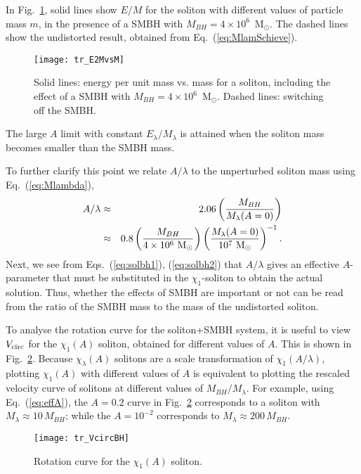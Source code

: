 \documentclass[aps,prd,floats,superscriptaddress,showpacs,nofootinbib,twocolumn,preprintnumbers]{revtex4-1}%
\def\be{\begin{eqnarray}}
\def\ee{\end{eqnarray}}
\def\no{\nonumber}
\begin{document}
\begin{appendix}
In Fig.~\ref{fig:E2MvsM}, solid lines show $E/M$ for the soliton with
different values of particle mass $m$, in the presence of a SMBH with
$M_{BH}=4\times10^6$~M$_\odot$. The dashed lines show the undistorted
result, obtained from Eq.~(\ref{eq:MlamSchieve}).  
%
\begin{figure}[hbp!]
\centering
\texttt{[image: tr\_E2MvsM]}
\caption{
Solid lines: energy per unit mass vs. mass for a soliton, including the effect of a SMBH with $M_{BH}=4\times10^6$~M$_\odot$. Dashed lines: switching off the SMBH.
}\label{fig:E2MvsM}
\end{figure}
%
The large $A$ limit with constant $E_\lambda/M_\lambda$ is attained
when the soliton mass becomes smaller than the SMBH mass. 

To further
clarify this
point we relate $A/\lambda$ to the
unperturbed soliton mass using Eq.~(\ref{eq:Mlambda}),  
%
\be \label{eq:effA}A/\lambda&\approx&2.06\left(\frac{M_{BH}}{M_\lambda(A=0)}
\right)
\\
&\approx&0.8\left(\frac{M_{BH}}{4\times10^6~\rm M_\odot}\right)
\left(\frac{M_\lambda(A=0)}{10^{7}~\rm M_\odot}\right)^{-1}.\no\ee
%
Next, we see from Eqs.~(\ref{eq:solbh1}),
(\ref{eq:solbh2}) that $A/\lambda$ gives an effective $A$-parameter
that must be substituted in the $\chi_1$-soliton to obtain the actual
solution. Thus, whether the effects of SMBH are important or not can be
read from the ratio of the SMBH mass to the mass of the undistorted
soliton. 

To analyse the rotation curve for the soliton+SMBH system, it is useful to view $V_{\rm circ}$ for the $\chi_1(A)$ soliton, obtained for different values of $A$. This is shown in Fig.~\ref{fig:VcircBH}. Because  $\chi_\lambda(A)$ solitons are a scale transformation of $\chi_1(A/\lambda)$, plotting $\chi_1(A)$ with different values of $A$ is equivalent to plotting the rescaled velocity curve of solitons at different values of $M_{BH}/M_\lambda$. For example, using Eq.~(\ref{eq:effA}), the $A=0.2$ curve in Fig.~\ref{fig:VcircBH} corresponds to a soliton with $M_\lambda\approx 10\,M_{BH}$; while the $A=10^{-2}$ corresponds to $M_\lambda\approx 200\,M_{BH}$. 
%
\begin{figure}[htbp!]
\centering
\texttt{[image: tr\_VcircBH]}
\caption{
Rotation curve for the $\chi_1(A)$ soliton.
}\label{fig:VcircBH}
\end{figure}
%


\end{appendix}
\end{document}
